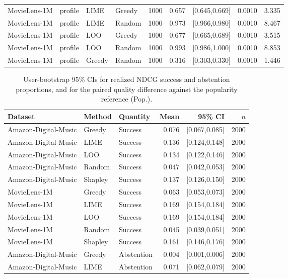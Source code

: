 \begin{table}[t]
\begin{tabular}{@{}llllrrrrr@{}}
MovieLens-1M & profile & LIME & Greedy & 1000 & 0.657 & [0.645,0.669] & 0.0010 & 3.335 \\
MovieLens-1M & profile & LIME & Random & 1000 & 0.973 & [0.966,0.980] & 0.0010 & 8.467 \\
MovieLens-1M & profile & LOO & Greedy & 1000 & 0.677 & [0.665,0.689] & 0.0010 & 3.515 \\
MovieLens-1M & profile & LOO & Random & 1000 & 0.993 & [0.986,1.000] & 0.0010 & 8.853 \\
MovieLens-1M & profile & Greedy & Random & 1000 & 0.316 & [0.303,0.330] & 0.0010 & 1.446 \\
\bottomrule
\end{tabular}
\end{table}

\begin{table}[t]\centering\scriptsize\setlength{\tabcolsep}{3pt}
\caption{User-bootstrap 95\% CIs for realized NDCG success and abstention
proportions, and for the paired quality difference against the popularity
reference (Pop.).}
\label{tab:prop-quality}
\begin{tabular}{@{}lllrrr@{}}
\toprule
Dataset & Method & Quantity & Mean & 95\% CI & $n$ \\
\midrule
Amazon-Digital-Music & Greedy & Success & 0.076 & [0.067,0.085] & 2000 \\
Amazon-Digital-Music & LIME & Success & 0.136 & [0.124,0.148] & 2000 \\
Amazon-Digital-Music & LOO & Success & 0.134 & [0.122,0.146] & 2000 \\
Amazon-Digital-Music & Random & Success & 0.047 & [0.042,0.053] & 2000 \\
Amazon-Digital-Music & Shapley & Success & 0.137 & [0.126,0.150] & 2000 \\
MovieLens-1M & Greedy & Success & 0.063 & [0.053,0.073] & 2000 \\
MovieLens-1M & LIME & Success & 0.169 & [0.154,0.184] & 2000 \\
MovieLens-1M & LOO & Success & 0.169 & [0.154,0.184] & 2000 \\
MovieLens-1M & Random & Success & 0.045 & [0.039,0.051] & 2000 \\
MovieLens-1M & Shapley & Success & 0.161 & [0.146,0.176] & 2000 \\
Amazon-Digital-Music & Greedy & Abstention & 0.004 & [0.001,0.006] & 2000 \\
Amazon-Digital-Music & LIME & Abstention & 0.071 & [0.062,0.079] & 2000 \\

\end{tabular}
\end{table}
